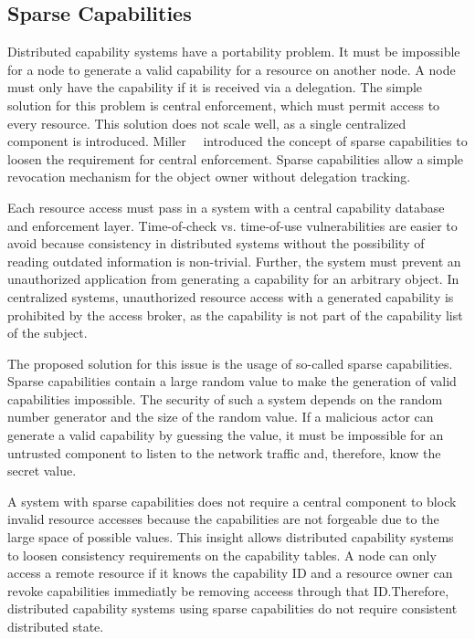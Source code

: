 \subsection{Sparse Capabilities}
Distributed capability systems have a portability problem. It must be impossible for a node to generate a valid capability for a resource on another node. A node must only have the capability if it is received via a delegation. The simple solution for this problem is central enforcement, which must permit access to every resource. This solution does not scale well, as a single centralized component is introduced. Miller~\etal{}~\cite{UsingSparseCapabilities1986} introduced the concept of sparse capabilities to loosen the requirement for central enforcement. Sparse capabilities allow a simple revocation mechanism for the object owner without delegation tracking.

Each resource access must pass in a system with a central capability database and enforcement layer. Time-of-check vs. time-of-use vulnerabilities are easier to avoid because consistency in distributed systems without the possibility of reading outdated information is non-trivial. Further, the system must prevent an unauthorized application from generating a capability for an arbitrary object. In centralized systems, unauthorized resource access with a generated capability is prohibited by the access broker, as the capability is not part of the capability list of the subject.

The proposed solution for this issue is the usage of so-called sparse capabilities. Sparse capabilities contain a large random value to make the generation of valid capabilities impossible. The security of such a system depends on the random number generator and the size of the random value. If a malicious actor can generate a valid capability by guessing the value, it must be impossible for an untrusted component to listen to the network traffic and, therefore, know the secret value.

A system with sparse capabilities does not require a central component to block invalid resource accesses because the capabilities are not forgeable due to the large space of possible values.
This insight allows distributed capability systems to loosen consistency requirements on the capability tables. A node can only access a remote resource if it knows the capability ID and a resource owner can revoke capabilities immediatly be removing acceess through that ID.\@ Therefore, distributed capability systems using sparse capabilities do not require consistent distributed state.

